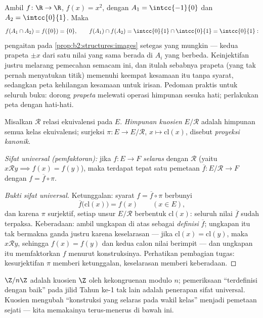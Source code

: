 \begin{example}\label{ex:b2:structures:imagestrict}
Ambil $f \colon \R \to \R$, $f(x) = x^2$, dengan $A_1 =
\intcc{-1}{0}$ dan $A_2 = \intcc{0}{1}$. Maka
\[
f(A_1 \cap A_2) = f(\{0\}) = \{0\},
\qquad
f(A_1) \cap f(A_2) = \intcc{0}{1} \cap \intcc{0}{1} =
\intcc{0}{1} :
\]
pengaitan pada \cref{prop:b2:structures:images} setegas yang
mungkin --- kedua prapeta $\pm x$ dari satu nilai yang sama
berada di $A_i$ yang berbeda. Keinjektifan justru melarang
pemecahan semacam ini, dan itulah sebabnya prapeta (yang tak
pernah menyatukan titik) memenuhi keempat kesamaan itu tanpa syarat,
sedangkan peta kehilangan kesamaan untuk irisan. Pedoman praktis
untuk seluruh buku: dorong \emph{prapeta} melewati operasi
himpunan sesuka hati; perlakukan peta dengan hati-hati.
\end{example}

\begin{definition}\label{def:b2:structures:quotient}
Misalkan $\mathcal{R}$ relasi ekuivalensi pada $E$. \emph{Himpunan
kuosien} $E/\mathcal{R}$ adalah himpunan semua
kelas ekuivalensi; surjeksi $\pi \colon E \to E/\mathcal{R}$,
$x \mapsto \mathrm{cl}(x)$, disebut \emph{proyeksi
kanonik}.

\emph{Sifat universal (pemfaktoran):} jika $f \colon E \to F$
\emph{selaras} dengan $\mathcal{R}$ (yaitu $x \mathbin{\mathcal{R}}
y \implies f(x) = f(y)$), maka terdapat tepat satu pemetaan $\overline f
\colon E/\mathcal{R} \to F$ dengan $f = \overline f \circ \pi$.
\end{definition}

\begin{proof}[Bukti sifat universal]
Ketunggalan: syarat $f = \overline f \circ \pi$ berbunyi
\[
\overline f\bigl(\mathrm{cl}(x)\bigr) = f(x)
\qquad (x \in E),
\]
dan karena $\pi$ surjektif, setiap unsur
$E/\mathcal{R}$ berbentuk $\mathrm{cl}(x)$: seluruh nilai
$\overline f$ sudah terpaksa. Keberadaan: ambil ungkapan di atas
sebagai \emph{definisi} $\overline f$; ungkapan itu tak bermakna
ganda justru karena keselarasan --- jika $\mathrm{cl}(x) =
\mathrm{cl}(y)$, maka $x \mathbin{\mathcal{R}} y$, sehingga $f(x) =
f(y)$ dan kedua calon nilai berimpit --- dan ungkapan itu
memfaktorkan $f$ menurut konstruksinya. Perhatikan pembagian tugas:
kesurjektifan $\pi$ memberi ketunggalan, keselarasan memberi keberadaan.
\end{proof}

\begin{example}
$\Z/n\Z$ adalah kuosien $\Z$ oleh kekongruenan modulo $n$; pemeriksaan
``terdefinisi dengan baik'' pada jilid Tahun ke-1 tak lain adalah
penerapan sifat universal. Kuosien mengubah ``konstruksi yang selaras
pada wakil kelas'' menjadi pemetaan sejati --- kita memakainya terus-menerus
di bawah ini.
\end{example}

